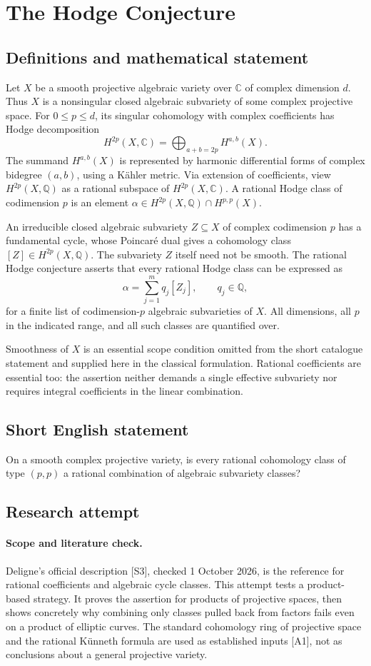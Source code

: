 \documentclass[11pt,a4paper]{article}
\begin{document}
\section*{The Hodge Conjecture}\label{statement}

\subsection{Definitions and mathematical statement}
Let $X$ be a smooth projective algebraic variety over $\mathbb C$ of
complex dimension $d$. Thus $X$ is a nonsingular closed algebraic subvariety
of some complex projective space. For $0\le p\le d$, its singular
cohomology with complex coefficients has Hodge decomposition
\[
 H^{2p}(X,\mathbb C)=\bigoplus_{a+b=2p}H^{a,b}(X).
\]
The summand $H^{a,b}(X)$ is represented by harmonic differential forms
of complex bidegree $(a,b)$, using a Kähler metric.
Via extension of coefficients, view $H^{2p}(X,\mathbb Q)$ as a rational
subspace of $H^{2p}(X,\mathbb C)$. A rational Hodge class of codimension
$p$ is an element
$\alpha\in H^{2p}(X,\mathbb Q)\cap H^{p,p}(X)$.

An irreducible closed algebraic subvariety $Z\subseteq X$ of complex
codimension $p$ has a fundamental cycle, whose Poincaré dual gives a
cohomology class $[Z]\in H^{2p}(X,\mathbb Q)$. The subvariety $Z$ itself
need not be smooth.
The rational Hodge conjecture asserts that every rational Hodge class
can be expressed as
\[
 \alpha=\sum_{j=1}^m q_j[Z_j],\qquad q_j\in\mathbb Q,
\]
for a finite list of codimension-$p$ algebraic subvarieties of $X$.
All dimensions, all $p$ in the indicated range, and all such classes
are quantified over.

Smoothness of $X$ is an essential scope condition omitted from the short
catalogue statement and supplied here in the classical formulation.
Rational coefficients are essential too: the assertion neither demands
a single effective subvariety nor requires integral coefficients in the
linear combination.
\subsection{Short English statement}
On a smooth complex projective variety, is every rational cohomology class of type $(p,p)$ a rational combination of algebraic subvariety classes?
\subsection{Research attempt}
\paragraph{Scope and literature check.}
Deligne's official description [S3], checked 1 October 2026, is the reference
for rational coefficients and algebraic cycle classes. This attempt tests a
product-based strategy. It proves the assertion for products of projective
spaces, then shows concretely why combining only classes pulled back from
factors fails even on a product of elliptic curves. The standard cohomology
ring of projective space and the rational K\"unneth formula are used as
established inputs [A1], not as conclusions about a general projective variety.
\end{document}
